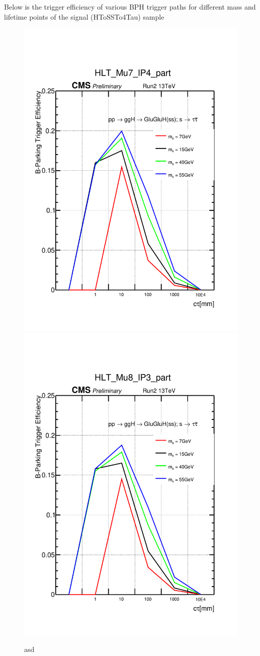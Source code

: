 Below is the trigger efficiency of various BPH trigger paths for different mass and lifetime points of the signal (HToSSTo4Tau) sample
\begin{figure}[h!]
  \caption{asd}
  \label{fig:Trigger Efficiency}
  \centering
  \includegraphics[width=0.47\linewidth]{figs/TrigEff_HLT_Mu7_IP4_part.pdf}
  \includegraphics[width=0.47\linewidth]{figs/TrigEff_HLT_Mu8_IP3_part.pdf}

\end{figure}
